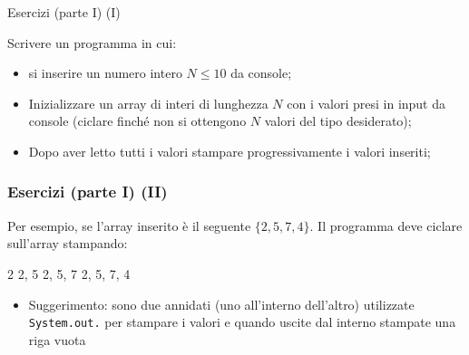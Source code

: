 \begin{frame}{Esercizi (parte I) (I)}

  Scrivere un programma in cui:
  \begin{itemize}
   \item si inserire un numero intero $N \leq 10$ da console;
   \item Inizializzare un  array  di  interi di lunghezza $N$ con  
   i valori presi in input  da  console (ciclare finché non si ottengono $N$ valori
   del tipo desiderato);
   \item Dopo aver letto tutti i valori stampare progressivamente i valori inseriti;
  \end{itemize}
\end{frame}
  
\begin{frame}[fragile]\frametitle{Esercizi (parte I) (II)}  
  Per esempio, se  l'array inserito è  il  seguente  $\{2,  5,  7,  4\}$. Il  programma deve ciclare
  sull’array stampando:
  \begin{center}
  \begin{JavaCodePlain}[commandchars=\\!|]
      2
      2, 5
      2, 5, 7
      2, 5, 7, 4
  \end{JavaCodePlain}   
  \end{center}

  \begin{itemize}
   \item Suggerimento: sono due  \Jfor{} annidati (uno all'interno dell’altro) utilizzate
   \texttt{System.out.}\JPrint{} per  stampare i valori e quando uscite dal \Jfor{}
   interno stampate una riga vuota
  \end{itemize}


\end{frame}
